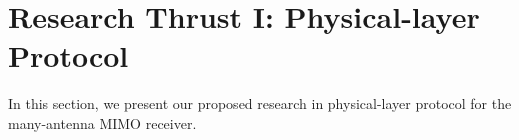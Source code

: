 \section{Research Thrust I: Physical-layer Protocol}\label{sec:physical}

In this section, we present our proposed research in physical-layer protocol for the many-antenna MIMO receiver. 
